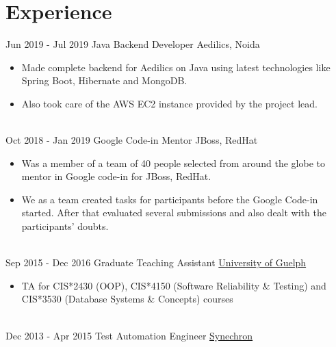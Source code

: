 \documentclass[letterpaper]{twentysecondcv} %
\begin{document}

\section{Experience}

\begin{twenty} %
\twentyitem
    	{Jun 2019 -}
		{Jul 2019}
        {Java Backend Developer}
        {{}{Aedilics, Noida}}
        {}
        {\begin{itemize}
        \item Made complete backend for Aedilics on Java using latest technologies like Spring Boot, Hibernate and MongoDB. \item Also took care of the AWS EC2 instance provided by the project lead. 
        \end{itemize}}
        \\
	\twentyitem
    	{Oct 2018 -}
		{Jan 2019}
        {Google Code-in Mentor}
        {{}{JBoss, RedHat}}
        {}
        {
        {\begin{itemize}
        \item Was a member of a team of 40 people selected from around the globe to mentor in Google code-in for JBoss, RedHat. \item We as a team created tasks for participants before the Google Code-in started. After that evaluated several submissions and also dealt with the participants' doubts. 
    \end{itemize}}
        }
    \\   
    \twentyitem
   		{Sep 2015 -}
		{Dec 2016}
        {Graduate Teaching Assistant}
        {\href{http://www.uoguelph.ca}{University of Guelph}}
        {}
        {
        {\begin{itemize}
        \item TA for CIS*2430 (OOP), CIS*4150 (Software Reliability \& Testing) and CIS*3530 (Database Systems \& Concepts) courses
    \end{itemize}}
        }
     \\
     \twentyitem
   		{Dec 2013 -}
		{Apr 2015}
        {Test Automation Engineer}
        {\href{http://www.synechron.com/}{Synechron}}
        {}
        {
        \begin{itemize}

\end{itemize}}
\end{twenty}
\end{document}

